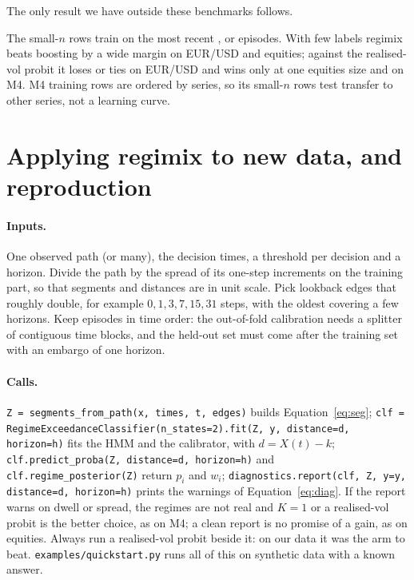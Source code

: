 \documentclass{article}
\begin{document}
The only result we have outside these benchmarks follows. \nPrivateLine

The small-$n$ rows train on the most recent \nCfgSmallA, \nCfgSmallB{} or \nCfgSmallC{} episodes.
With few labels regimix beats boosting by a wide margin on EUR/USD and equities; against the realised-vol probit it loses or ties on EUR/USD and wins only at one equities size and on M4.
M4 training rows are ordered by series, so its small-$n$ rows test transfer to other series, not a learning curve.


\section{Applying regimix to new data, and reproduction}
\label{app:use}

\paragraph{Inputs.}
One observed path (or many), the decision times, a threshold per decision and a horizon.
Divide the path by the spread of its one-step increments on the training part, so that segments and distances are in unit scale.
Pick lookback edges that roughly double, for example $0,1,3,7,15,31$ steps, with the oldest covering a few horizons.
Keep episodes in time order: the out-of-fold calibration needs a splitter of contiguous time blocks, and the held-out set must come after the training set with an embargo of one horizon.

\paragraph{Calls.}
\texttt{Z = segments\_from\_path(x, times, t, edges)} builds Equation~\eqref{eq:seg};
\texttt{clf = RegimeExceedanceClassifier(n\_states=2).fit(Z, y, distance=d, horizon=h)} fits the HMM and the calibrator, with $d=X(t)-k$;
\texttt{clf.predict\_proba(Z, distance=d, horizon=h)} and \texttt{clf.regime\_posterior(Z)} return $p_i$ and $w_i$;
\texttt{diagnostics.report(clf, Z, y=y, distance=d, horizon=h)} prints the warnings of Equation~\eqref{eq:diag}.
If the report warns on dwell or spread, the regimes are not real and $K=1$ or a realised-vol probit is the better choice, as on M4; a clean report is no promise of a gain, as on equities.
Always run a realised-vol probit beside it: on our data it was the arm to beat.
\texttt{examples/quickstart.py} runs all of this on synthetic data with a known answer.
\end{document}
